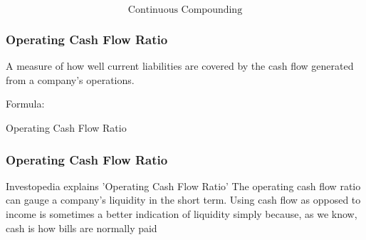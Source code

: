 \documentclass{beamer}
\begin{document}
\begin{frame}
\Large
\[
\mbox{Continuous Compounding}
\]
\end{frame}


\begin{frame}
\frametitle{Operating Cash Flow Ratio}

A measure of how well current liabilities are covered by the cash flow generated from a company's operations. 

Formula: 

Operating Cash Flow Ratio
 
\end{frame}


\begin{frame}
\frametitle{Operating Cash Flow Ratio} 
Investopedia explains 'Operating Cash Flow Ratio'
The operating cash flow ratio can gauge a company's liquidity in the short term. Using cash flow as opposed to income is sometimes a better indication of liquidity simply because, as we know, cash is how bills are normally paid  
\end{frame}
\end{document}
